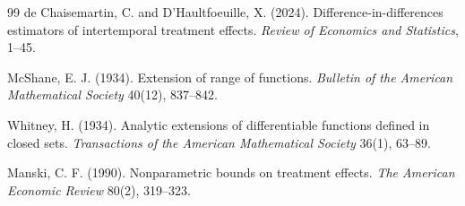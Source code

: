 \documentclass[11pt]{article}
\theoremstyle{definition}
\theoremstyle{plain}
\theoremstyle{remark}
\begin{document}
\begin{thebibliography}{99}
de Chaisemartin, C. and D'Haultfoeuille, X. (2024).
\newblock Difference-in-differences estimators of intertemporal treatment effects.
\newblock \emph{Review of Economics and Statistics}, 1--45.

McShane, E. J. (1934).
\newblock Extension of range of functions.
\newblock \emph{Bulletin of the American Mathematical Society} 40(12), 837--842.

Whitney, H. (1934).
\newblock Analytic extensions of differentiable functions defined in closed sets.
\newblock \emph{Transactions of the American Mathematical Society} 36(1), 63--89.

Manski, C. F. (1990).
\newblock Nonparametric bounds on treatment effects.
\newblock \emph{The American Economic Review} 80(2), 319--323.
\end{thebibliography}
\end{document}
